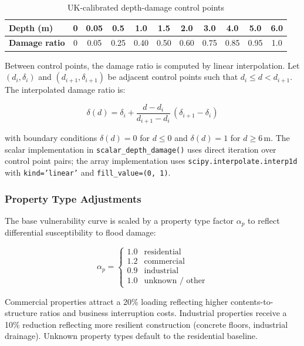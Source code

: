 \documentclass[11pt,a4paper]{article}
\begin{document}
\begin{table}[H]
\centering
\begin{tabular}{lcccccccccc}
    \toprule
    \textbf{Depth (m)} & 0 & 0.05 & 0.5 & 1.0 & 1.5 & 2.0 & 3.0 & 4.0 & 5.0 & 6.0 \\
    \midrule
    \textbf{Damage ratio} & 0 & 0.05 & 0.25 & 0.40 & 0.50 & 0.60 & 0.75 & 0.85 & 0.95 & 1.0 \\
    \bottomrule
\end{tabular}
\caption{UK-calibrated depth-damage control points}
\label{tab:dd_control}
\end{table}

Between control points, the damage ratio is computed by linear interpolation. Let
$(d_i, \delta_i)$ and $(d_{i+1}, \delta_{i+1})$ be adjacent control points such that
$d_i \leq d < d_{i+1}$. The interpolated damage ratio is:

\begin{equation}
    \delta(d) = \delta_i + \frac{d - d_i}{d_{i+1} - d_i} \, (\delta_{i+1} - \delta_i)
    \label{eq:dd_interp}
\end{equation}

\noindent with boundary conditions $\delta(d) = 0$ for $d \leq 0$ and $\delta(d) = 1$
for $d \geq 6\,$m. The scalar implementation in \texttt{scalar\_depth\_damage()}
uses direct iteration over control point pairs; the array implementation uses
\texttt{scipy.interpolate.interp1d} with \texttt{kind='linear'} and
\texttt{fill\_value=(0, 1)}.

\subsubsection{Property Type Adjustments}

The base vulnerability curve is scaled by a property type factor $\alpha_p$ to
reflect differential susceptibility to flood damage:

\begin{equation}
    \alpha_p = \begin{cases}
        1.0 & \text{residential} \\
        1.2 & \text{commercial} \\
        0.9 & \text{industrial} \\
        1.0 & \text{unknown / other}
    \end{cases}
    \label{eq:type_factor}
\end{equation}

\noindent Commercial properties attract a 20\% loading reflecting higher
contents-to-structure ratios and business interruption costs. Industrial properties
receive a 10\% reduction reflecting more resilient construction (concrete floors,
industrial drainage). Unknown property types default to the residential baseline.
\end{document}
